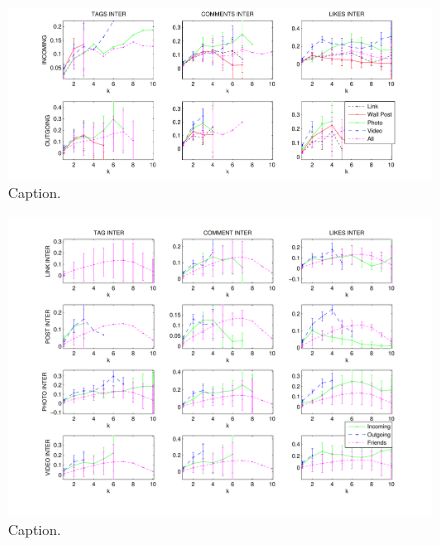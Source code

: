 \begin{figure}[t!]
\centering
\includegraphics[scale=0.70]{data/dir_vs_lwppv_fix}
\caption{Caption.}
\label{fig:res1}
\end{figure}


\begin{figure}[t!]
\centering
\includegraphics[scale=0.70]{data/likes_vs_inter_fix}
\caption{Caption.}
\label{fig:res2}
\end{figure}


